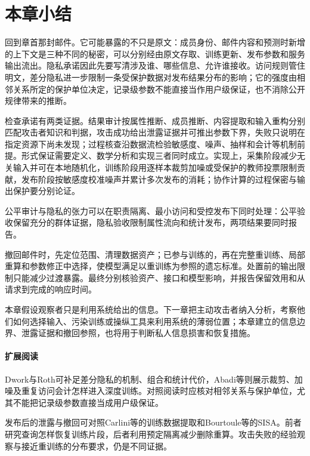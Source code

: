 \section{本章小结}
\label{sec:privacy-summary}

回到章首那封邮件。它可能暴露的不只是原文：成员身份、邮件内容和预测时新增的上下文是三种不同的秘密，可以分别经由原文存取、训练更新、发布参数和服务输出流出。隐私承诺因此先要写清涉及谁、哪些信息、允许谁接收。访问规则管住明文，差分隐私进一步限制一条受保护数据对发布结果分布的影响；它的强度由相邻关系所定的保护单位决定，记录级参数不能直接当作用户级保证，也不消除公开规律带来的推断。

检查承诺有两类证据。结果审计按属性推断、成员推断、内容提取和输入重构分别匹配攻击者知识和判据，攻击成功给出泄露证据并可推出参数下界，失败只说明在指定资源下尚未发现；过程核查沿数据流检验敏感度、噪声、抽样和会计等机制前提。形式保证需要定义、数学分析和实现三者同时成立。实现上，采集阶段减少无关输入并可在本地随机化，训练阶段用逐样本裁剪加噪或受保护的教师投票限制贡献，发布阶段按敏感度校准噪声并累计多次发布的消耗；协作计算的过程保密与输出保护要分别论证。

公平审计与隐私的张力可以在职责隔离、最小访问和受控发布下同时处理：公平验收保留充分的群体证据，隐私验收限制属性流向和统计发布，两项结果要同时报告。

撤回邮件时，先定位范围、清理数据资产；已参与训练的，再在完整重训练、局部重算和参数修正中选择，使模型满足以重训练为参照的遗忘标准。处置前的输出限制只能减少过渡暴露。最终分别核验资产、接口和模型影响，并报告保留效用和从请求到完成的响应时间。

本章假设观察者只是利用系统给出的信息。下一章把主动攻击者纳入分析，考察他们如何选择输入、污染训练或操纵工具来利用系统的薄弱位置；本章建立的信息边界、泄露证据和撤回参照，也将用于判断私人信息损害和恢复措施。

\paragraph{扩展阅读}

Dwork与Roth可补足差分隐私的机制、组合和统计代价，Abadi等则展示裁剪、加噪及重复访问会计怎样进入深度训练。对照阅读时应核对相邻关系与保护单位，尤其不能把记录级参数直接当成用户级保证。

发布后的泄露与撤回可对照Carlini等的训练数据提取和Bourtoule等的SISA。前者研究查询怎样恢复训练片段，后者利用预定隔离减少删除重算。攻击失败的经验观察与接近重训练的分布要求，仍是不同证据。
